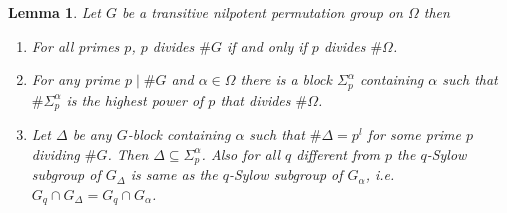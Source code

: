 \documentclass[11pt]{madras}%
\newtheorem{lemma}[theorem]{Lemma}
\theoremstyle{remark}
\begin{document}
\begin{lemma}\label{lem-struct-nilpotent}
  Let $G$ be a transitive nilpotent permutation group on $\Omega$ then
  \begin{enumerate}

  \item For all primes $p$, $p$ divides $\#G$ if and only if $p$
    divides $\# \Omega$.\label{lem-struct-nilpotent-ps}

  \item For any prime $p \mid \# G$ and $\alpha \in \Omega$ there is a
    block $\Sigma_p^\alpha$ containing $\alpha$ such that $\#
    \Sigma_p^\alpha$ is the highest power of $p$ that divides $\#
    \Omega$.\label{lem-struct-nilpotent-sigma}
  \item Let $\Delta$ be any $G$-block containing $\alpha$ such that
    $\# \Delta = p^l$ for some prime $p$ dividing $\# G$. Then $\Delta
    \subseteq \Sigma_p^\alpha$. Also for all $q$ different from $p$
    the $q$-Sylow subgroup of $G_\Delta$ is same as the $q$-Sylow
    subgroup of $G_\alpha$, i.e. $G_q \cap G_\Delta = G_q \cap
    G_\alpha$.
  \end{enumerate}
\end{lemma}
\end{document}
